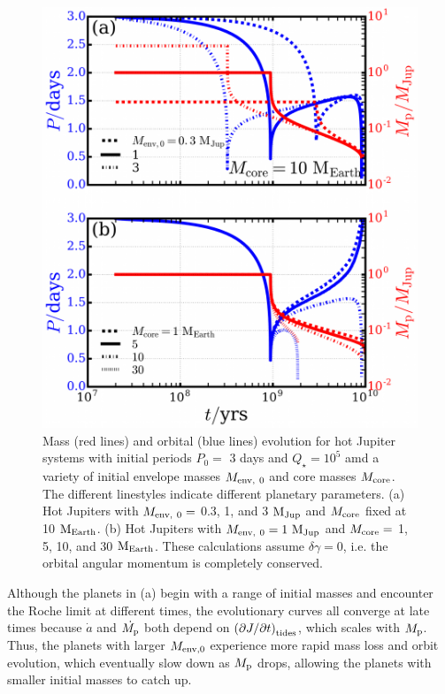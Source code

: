 \documentclass{svjour3}                     %
\begin{document}
\begin{figure}
\includegraphics[width=\textwidth]{plot_mass_orbital_evolution_variable-Mp0-Mcore}
\caption{Mass (red lines) and orbital (blue lines) evolution for hot Jupiter systems with initial periods $P_{0} =$ 3 days and $Q_\star = 10^5$ amd a variety of initial envelope masses $M_{\rm env,\ 0}$ and core masses $M_{\rm core}$. The different linestyles indicate different planetary parameters. (a) Hot Jupiters with $M_{\rm env,\ 0} =$ 0.3, 1, and 3 ${\rm M_{Jup}}$ and $M_{\rm core}$ fixed at 10 ${\rm M_{Earth}}$. (b) Hot Jupiters with $M_{\rm env,\ 0} = 1\ {\rm M_{Jup}}$ and $M_{\rm core} = $ 1, 5, 10, and 30 ${\rm M_{Earth}}$. These calculations assume $\delta \gamma = 0$, i.e. the orbital angular momentum is completely conserved.}
\label{fig:plot_mass_orbital_evolution_variable-Mp0-Mcore}
\end{figure}

Although the planets in (a) begin with a range of initial masses and encounter the Roche limit at different times, the evolutionary curves all converge at late times because $\dot{a}$ and $\dot{M_{\rm p}}$ both depend on $\left( \partial J/\partial t \right)_{\rm tides}$, which scales with $M_{\rm p}$. Thus, the planets with larger $M_{\rm env, 0}$ experience more rapid mass loss and orbit evolution, which eventually slow down as $M_{\rm p}$ drops, allowing the planets with smaller initial masses to catch up. 
\end{document}

